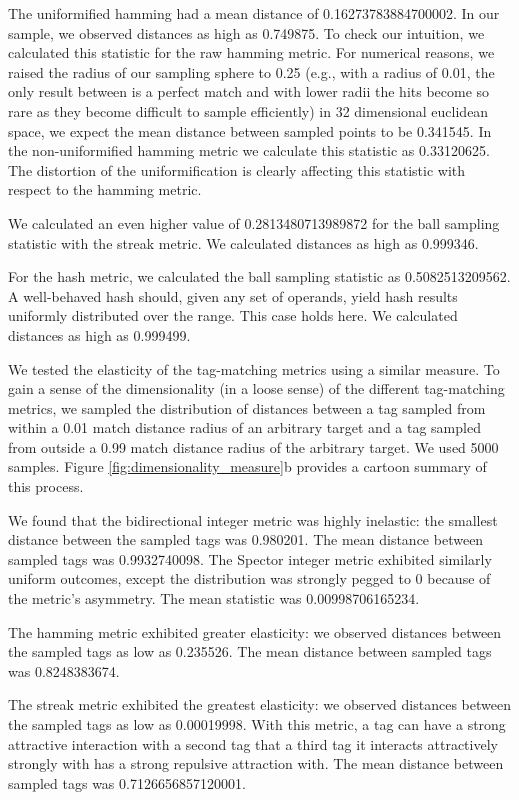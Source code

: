 The uniformified hamming had a mean distance of 0.16273783884700002.
In our sample, we observed distances as high as 0.749875.
To check our intuition, we calculated this statistic for the raw hamming metric.
For numerical reasons, we raised the radius of our sampling sphere to 0.25 (e.g., with a radius of 0.01, the only result between is a perfect match and with lower radii the hits become so rare as they become difficult to sample efficiently)
in 32 dimensional euclidean space, we expect the mean distance between sampled points to be 0.341545.
In the non-uniformified hamming metric we calculate this statistic as 0.33120625.
The distortion of the uniformification is clearly affecting this statistic with respect to the hamming metric.

We calculated an even higher value of 0.2813480713989872 for the ball sampling statistic with the streak metric.
We calculated distances as high as 0.999346.

For the hash metric, we calculated the ball sampling statistic as 0.5082513209562.
A well-behaved hash should, given any set of operands, yield hash results uniformly distributed over the range.
This case holds here.
We calculated distances as high as 0.999499.



We tested the elasticity of the tag-matching metrics using a similar measure.
To gain a sense of the dimensionality (in a loose sense) of the different tag-matching metrics, we sampled the distribution of distances between a tag sampled from within a 0.01 match distance radius of an arbitrary target and a tag sampled from outside a 0.99 match distance radius of the arbitrary target.
We used 5000 samples.
Figure \ref{fig:dimensionality_measure}b provides a cartoon summary of this process.

We found that the bidirectional integer metric was highly inelastic: the smallest distance between the sampled tags was 0.980201.
The mean distance between sampled tags was 0.9932740098.
The Spector integer metric exhibited similarly uniform outcomes, except the distribution was strongly pegged to 0 because of the metric's asymmetry.
The mean statistic was 0.00998706165234.

The hamming metric exhibited greater elasticity: we observed distances between the sampled tags as low as 0.235526.
The mean distance between sampled tags was 0.8248383674.

The streak metric exhibited the greatest elasticity: we observed distances between the sampled tags as low as 0.00019998.
With this metric, a tag can have a strong attractive interaction with a second tag that a third tag it interacts attractively strongly with has a strong repulsive attraction with.
The mean distance between sampled tags was 0.7126656857120001.

